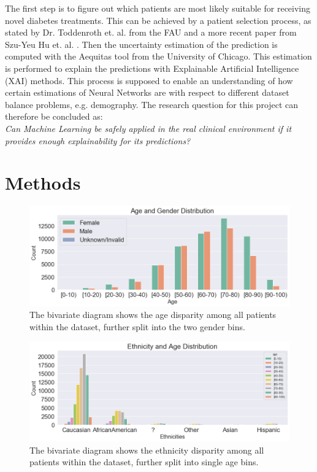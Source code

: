 \documentclass[journal]{IEEEtran}
\begin{document}
The first step is to figure out which patients are most likely suitable for receiving novel diabetes treatments. This can be achieved by a patient selection process, as stated by Dr. Toddenroth et. al. from the FAU \cite{cite4} and a more recent paper from Szu-Yeu Hu et. al. \cite{cite3}. Then the uncertainty estimation of the prediction is computed with the Aequitas tool from the University of Chicago. This estimation is performed to explain the predictions with Explainable Artificial Intelligence (XAI) methods. This process is supposed to enable an understanding of how certain estimations of Neural Networks are with respect to different dataset balance problems, e.g. demography. The research question for this project can therefore be concluded as: \\

\textit{Can Machine Learning be safely applied in the real clinical environment if it provides enough explainability for its predictions?} 

\section{Methods}
\begin{figure}
	\centering
	\includegraphics[width=1\linewidth]{../imgs/age_new}
	\caption{The bivariate diagram shows the age disparity among all patients within the dataset, further split into the two gender bins.}
	\label{fig:age}
\end{figure}

\begin{figure}
	\centering
	\includegraphics[width=1\linewidth]{../imgs/ethnicities_new}
	\caption{The bivariate diagram shows the ethnicity disparity among all patients within the dataset, further split into single age bins.}
	\label{fig:eth}
\end{figure}
\end{document}
